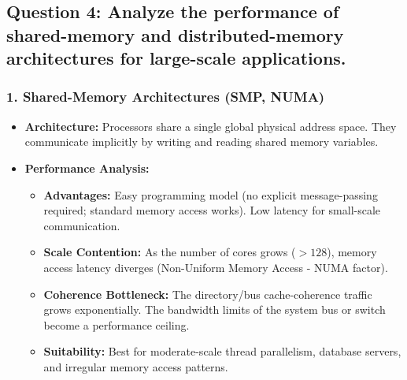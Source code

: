 \documentclass[11pt, a4paper]{article}
\begin{document}
\subsection*{Question 4: Analyze the performance of shared-memory and distributed-memory architectures for large-scale applications.}

\subsubsection*{1. Shared-Memory Architectures (SMP, NUMA)}
\begin{itemize}
    \item \textbf{Architecture:} Processors share a single global physical address space. They communicate implicitly by writing and reading shared memory variables.
    \item \textbf{Performance Analysis:}
    \begin{itemize}
        \item \textbf{Advantages:} Easy programming model (no explicit message-passing required; standard memory access works). Low latency for small-scale communication.
        \item \textbf{Scale Contention:} As the number of cores grows ($>128$), memory access latency diverges (Non-Uniform Memory Access - NUMA factor).
        \item \textbf{Coherence Bottleneck:} The directory/bus cache-coherence traffic grows exponentially. The bandwidth limits of the system bus or switch become a performance ceiling.
        \item \textbf{Suitability:} Best for moderate-scale thread parallelism, database servers, and irregular memory access patterns.
    \end{itemize}
\end{itemize}
\end{document}
